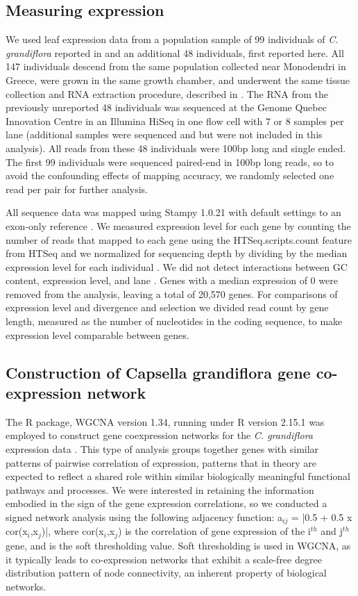 \subsection{Measuring expression}
We used leaf expression data from a population sample of 99 individuals of \textit{C. grandiflora} reported in \citet{Josephs2015-nx} and an additional 48 individuals, first reported here. All 147 individuals descend from the same population collected near Monodendri in Greece, were grown in the same growth chamber, and underwent the same tissue collection and RNA extraction procedure, described in \citet{Josephs2015-nx}. The RNA from the previously unreported 48 individuals was sequenced at the Genome Quebec Innovation Centre in an Illumina HiSeq in one flow cell with 7 or 8 samples per lane (additional samples were sequenced and but were not included in this analysis). All reads from these 48 individuals were 100bp long and single ended. The first 99 individuals were sequenced paired-end in 100bp long reads, so to avoid the confounding effects of mapping accuracy, we randomly selected one read per pair for further analysis.

All sequence data was mapped using Stampy 1.0.21 \citep{Lunter2011-uc} with default settings to an exon-only reference \citep{Josephs2015-nx}. We measured expression level for each gene by counting the number of reads that mapped to each gene using the HTSeq.scripts.count feature from HTSeq and we normalized for sequencing depth by dividing by the median expression level for each individual \citep{Anders2015-qa}. We did not detect interactions between GC content, expression level, and lane \citep{Josephs2015-nx}. Genes with a median expression of 0 were removed from the analysis, leaving a total of 20,570 genes. For comparisons of expression level and divergence and selection we divided read count by gene length, measured as the number of nucleotides in the coding sequence, to make expression level comparable between genes.

\subsection{Construction of Capsella grandiflora gene co-expression network}
The R package, WGCNA version 1.34, running under R version 2.15.1 \citep{r} was employed to construct gene coexpression networks for the \textit{C. grandiflora} expression data \citep{langfelder2008}. This type of analysis groups together genes with similar patterns of pairwise correlation of expression, patterns that in theory are expected to reflect a shared role within similar biologically meaningful functional pathways and processes. We were interested in retaining the information embodied in the sign of the gene expression correlations, so we conducted a signed network analysis using the following adjacency function: a$_{ij}$ = |0.5 + 0.5 x cor(x$_{i}$,x$_{j}$)|, where cor(x$_{i}$,x$_{j}$) is the correlation of gene expression of the i$^{th}$ and j$^{th}$ gene, and is the soft thresholding value. Soft thresholding is used in WGCNA, as it typically leads to co-expression networks that exhibit a scale-free degree distribution pattern of node connectivity, an inherent property of biological networks. 

